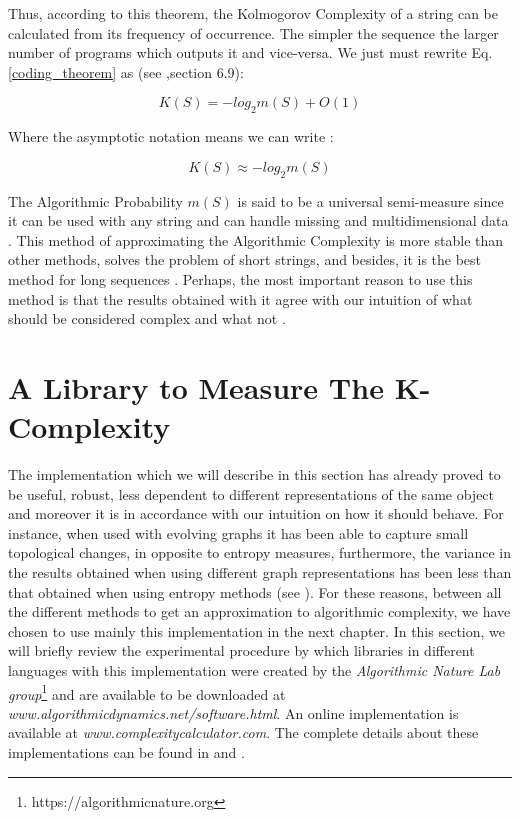 Thus, according to this theorem, the Kolmogorov Complexity of a string can be calculated from its frequency of occurrence. The simpler the sequence the larger number of programs which outputs it and vice-versa. We just must rewrite Eq. \ref{coding_theorem} as (see \cite{kolmo_book2},section 6.9):

\begin{equation}
K(S)=-log_{2}m(S)+ O(1)
\end{equation}

Where the asymptotic notation means we can write \cite{kolmo_graph}:

\begin{equation}
\label{coding_eq}
K(S)\approx -log_{2}m(S)
\end{equation}

The Algorithmic Probability $m(S)$ is said to be a universal semi-measure since it can be used with any string and can handle missing and multidimensional data \cite{decomposition}. This method of approximating the Algorithmic Complexity is more stable than other methods, solves the problem of short strings, and besides, it is the best method for long sequences \cite{faibles_complexites}. Perhaps, the most important reason to use this method is that the results obtained with it agree with our intuition of what should be considered complex and what not \cite{faibles_complexites}.

\section{A Library to Measure The K-Complexity}
\label{Library_K_complex}
The implementation which we will describe in this section has already proved to be useful, robust, less dependent to different representations of the same object and moreover it is in accordance with our intuition on how it should behave. For instance, when used with evolving graphs it has been able to capture small topological changes, in opposite to entropy measures, furthermore, the variance in the results obtained when using different graph representations has been less than that obtained when using entropy methods (see \cite{kolmo_graph}). For these reasons, between all the different methods to get an approximation to algorithmic complexity, we have chosen to use mainly this implementation in the next chapter. In this section, we will briefly review the experimental procedure by which libraries in different languages with this implementation were created by the \textit{Algorithmic Nature Lab group}\footnote{https://algorithmicnature.org} and are available to be downloaded at \textit{www.algorithmicdynamics.net/software.html}. An online implementation is available at \textit{www.complexitycalculator.com}. The complete details about these implementations can be found in \cite{decomposition} and \cite{kolmo_calculating}. 

